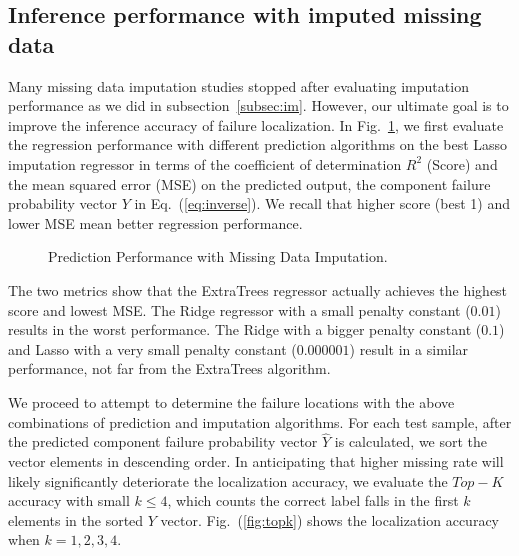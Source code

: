 \subsection{Inference performance with imputed missing data}
Many missing data imputation studies stopped after evaluating imputation performance as we did in subsection~\ref{subsec:im}. 
However, our ultimate goal is to improve the inference accuracy of failure localization. In Fig.~\ref{fig:score}, we first evaluate the 
regression performance with different prediction algorithms on the best Lasso imputation regressor in terms of the 
coefficient of determination $R^2$ (Score) and the mean squared error (MSE) on the predicted output, the component 
failure probability vector $Y$ in Eq.~(\ref{eq:inverse}). We recall that higher score (best 1) and lower MSE mean better regression performance. 

  \begin{figure}[!ht]
    \hfill
    \caption{Prediction Performance with Missing Data Imputation.}
    \label{fig:score}
  \end{figure}
  
The two metrics show that the ExtraTrees regressor actually achieves the highest score and lowest MSE. The Ridge regressor with a small penalty constant ($0.01$) results in the worst performance. The Ridge with a bigger penalty constant ($0.1$) and Lasso with a very small penalty constant ($0.000001$) result in a similar performance, not far from the ExtraTrees algorithm. 
  
We proceed to attempt to determine the failure locations with the above combinations of prediction and imputation algorithms. For each test sample, after the predicted component failure probability vector $\hat{Y}$ is calculated, we sort the vector elements in descending order. In anticipating that higher missing rate will likely significantly deteriorate the localization accuracy, we evaluate the $Top-K$ accuracy with small $k\le4$, which counts the correct label falls in the first $k$ elements in the sorted $Y$ vector. Fig.~(\ref{fig:topk}) shows the localization accuracy when $k=1,2,3,4$. 
  
